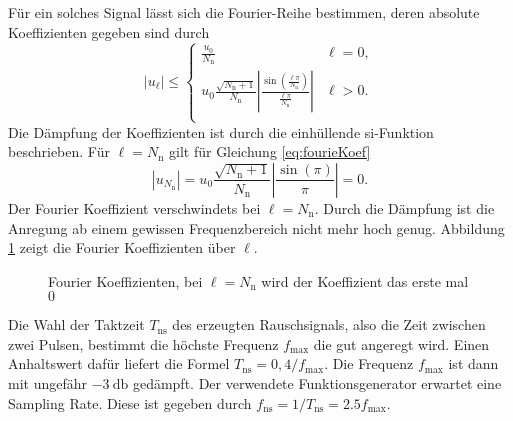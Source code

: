 \documentclass[12pt,report,final,twoside,accentcolor=tud9b,bigchapter]{tudreport}
\begin{document}
Für ein solches Signal lässt sich die Fourier-Reihe bestimmen, deren
absolute Koeffizienten gegeben sind durch
\begin{equation}
|u_\ell| \le \left\{\begin{array}{ll} \frac{u_0}{N_\mathrm{n}} & \ell=0,
\\
u_0\frac{\sqrt{N_\mathrm{n}+1}}{N_\mathrm{n}}\left|\frac{\sin\left(\frac{\ell
\pi}{N_\mathrm{n}}\right)}{\frac{\ell \pi}{N_\mathrm{n}}}\right| & \ell
>0. \\
          \end{array}\right.
\label{eq:fourieKoef}
\end{equation}
Die Dämpfung der Koeffizienten ist durch die einhüllende si-Funktion beschrieben.
Für $\ell=N_\mathrm{n}$ gilt für Gleichung \eqref{eq:fourieKoef}
\begin{equation}
|u_{N_\mathrm{n}}|=u_0
\frac{\sqrt{N_\mathrm{n}+1}}{N_\mathrm{n}}\left|\frac{\sin\left(\pi\right)}{\pi}\right|=0.
\end{equation}
Der Fourier Koeffizient verschwindets bei $\ell=N_\mathrm{n}$. Durch
die Dämpfung ist die Anregung ab einem gewissen Frequenzbereich nicht
mehr hoch genug. Abbildung \ref{fig:FourierMLBS} zeigt die Fourier Koeffizienten über $\ell$.
\begin{figure}[h!]
\caption{Fourier Koeffizienten, bei $\ell =N_\mathrm{n}$ wird der Koeffizient das erste mal $0$ }
  \label{fig:FourierMLBS}
\end{figure}
Die Wahl der Taktzeit $T_{\mathrm{ns}}$ des erzeugten Rauschsignals,
also die Zeit zwischen zwei Pulsen, bestimmt die höchste Frequenz $f_\mathrm{max}$ die gut angeregt wird. Einen Anhaltswert dafür
liefert die Formel $T_{\mathrm{ns}}=0,4/f_{\mathrm{max}}$. Die Frequenz $f_\mathrm{max}$ ist dann mit ungefähr $\SI{-3}{\decibel}$ gedämpft. Der verwendete Funktionsgenerator erwartet eine Sampling Rate. Diese ist gegeben durch $f_\mathrm{ns}=1/T_{\mathrm{ns}}=2.5f_{\mathrm{max}}$.
\end{document}
